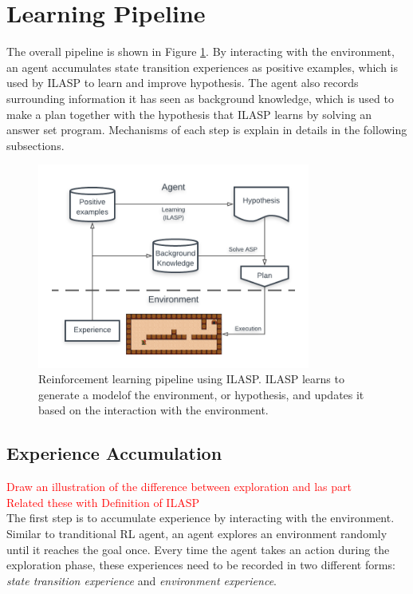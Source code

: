 \section{Learning Pipeline}
\label{learning_pipeline_section}

The overall pipeline is shown in Figure \ref{fig:pipeline}. By interacting with the environment, an agent accumulates state transition experiences as positive examples, which is used by ILASP to learn and improve hypothesis.
The agent also records surrounding information it has seen as background knowledge, which is used to make a plan together with the hypothesis that ILASP learns by solving an answer set program. 
Mechanisms of each step is explain in details in the following subsections. 

\begin{figure}[!htb]
\centering
\includegraphics[width=0.8\textwidth]{./figures/architecture}
\caption{Reinforcement learning pipeline using ILASP. ILASP learns to generate a modelof the environment, or hypothesis, and updates it based on the interaction with the environment. }
\label{fig:pipeline}
\end{figure}

\subsection{Experience Accumulation}
\label{experience_accumulation}
\textcolor{red}{Draw an illustration of the difference between exploration and las part}\\
\textcolor{red}{Related these with Definition of ILASP}\\
The first step is to accumulate experience by interacting with the environment. Similar to tranditional RL agent, an agent explores an environment randomly until it reaches the goal once. 
Every time the agent takes an action during the exploration phase, these experiences need to be recorded in two different forms: \textit{state transition experience} and \textit{environment experience}.

